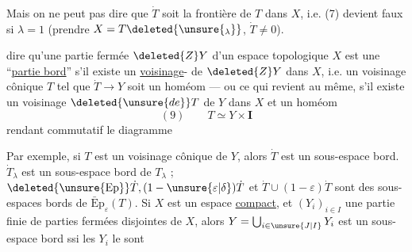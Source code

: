 Mais on ne peut pas dire  que $\dot T$ soit la frontière
de $T$ dans $X$, i.e. (7) devient faux si $\lambda=1$
(prendre $X=T\deleted{\unsure{_\lambda}}$,  $\dot T\neq0$).

   dire qu'une partie fermée $\deleted{Z}Y$ d'un
espace topologique $X$ est une ``\uline{partie bord}''
s'il existe un \uline{voisinage}-
 de $\deleted{Z}Y$ dans $X$,
i.e. un voisinage  cônique $T$ tel que
$\dot T\longrightarrow Y$ soit un homéom --- ou ce qui revient
au même,  s'il existe un
voisinage $\deleted{\unsure{de}}T$ de $Y$ dans $X$ et un homéom
\[
(9)\qquad T\simeq Y\times\mathbf{I}
\]
rendant commutatif le diagramme

Par exemple, si $T$ est un voisinage  cônique
 de  $Y$, alors $\dot T$ est un sous-espace bord.
 $\dot T_\lambda$ est un sous-espace bord de $T_\lambda$ ;
$\deleted{\unsure{\mathrm{Ep}}}\dot T,(1-\unsure{\varepsilon|\delta})\dot T$
et $\dot T\cup(1-\varepsilon)\dot T$ sont des sous-espaces
bords de $\bar{\mathrm{E}}\mathrm{p}_\varepsilon(T)$. 
Si $X$ est un espace
\uline{compact}, et $(Y_i)_{i\in I}$ une partie finie de
parties fermées disjointes de $X$, alors
$Y=\bigcup_{i\in\unsure{J|I}}Y_i$ est un sous-espace bord ssi les $Y_i$ le sont
